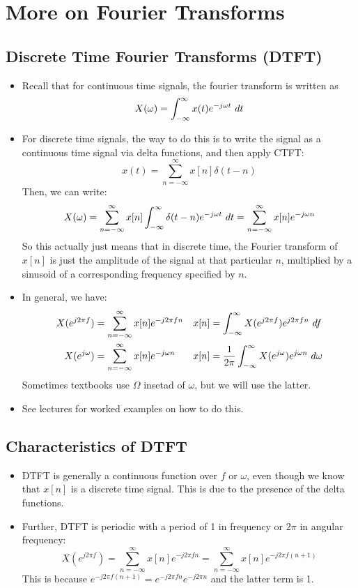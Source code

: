 \section{More on Fourier Transforms}
\subsection{Discrete Time Fourier Transforms (DTFT)}
\begin{itemize}
	\item Recall that for continuous time signals, the fourier transform is written as 
		\[
		X(\omega) = \int_{-\infty}^{\infty} x(t) e^{-j \omega t}\ d t 
		\] 
	\item For discrete time signals, the way to do this is to write the signal as a continuous time signal 
		via delta functions, and then apply CTFT:
		 \[
			 x(t) = \sum_{n=-\infty}^{\infty} x[n] \delta(t - n)
		\] 
		Then, we can write:
		\[
			X(\omega) = \sum_{n=-\infty}^{\infty} x[n] \int_{-\infty}^{\infty} \delta(t - n) e^{-j \omega t}\ d t
			= \sum_{n=-\infty}^{\infty} x[n] e^{- j \omega n }
		\] 
		So this actually just means that in discrete time, the Fourier transform of \( x[n] \) is just 
		the amplitude of the signal at that particular \( n \), multiplied by a sinusoid of a corresponding 
		frequency specified by \( n \). 
	\item In general, we have:
		\begin{align*}
			X(e^{j 2 \pi f}) &= \sum_{n=-\infty}^{\infty} x[n] e^{-j 2 \pi f n} & x[n] &=
			\int_{-\infty}^{\infty} X(e^{j 2 \pi f})e^{j 2 \pi f n}\ d f \\
			X(e^{j \omega}) &= \sum_{n=-\infty}^{\infty} x[n] e^{-j \omega n} & x[n] &= \frac{1}{2\pi}
			\int_{-\infty}^{\infty} X(e^{j \omega}) e^{j \omega n}\ d  \omega 
		\end{align*}
		Sometimes textbooks use \( \Omega \) insetad of \( \omega \), but we will use the latter.   
	\item See lectures for worked examples on how to do this.
\end{itemize}

\subsection{Characteristics of DTFT}
\begin{itemize}
	\item DTFT is generally a continuous function over \( f \) or \( \omega \), even though we know that 
		\( x[n] \) is a discrete time signal. This is due to the presence of the delta functions. 
	\item Further, DTFT is periodic with a period of 1 in frequency or  \( 2\pi \) in angular 
		frequency:
		\[
			X(e^{j 2\pi f}) = \sum_{n=-\infty}^{\infty} x[n] e^{-j 2\pi f n} = \sum_{n=-\infty}^{\infty} x[n] 
			e^{-j2 \pi f (n + 1)}
		\] 
		This is because  \( e^{-j 2 \pi f(n + 1)} = e^{-j 2 \pi f n}e^{-j 2 \pi n} \) and the latter term is 1. 
\end{itemize}
